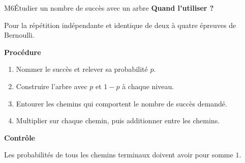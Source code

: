 \begin{fichemethode}{M6}{Étudier un nombre de succès avec un arbre}
  \textbf{Quand l'utiliser ?}

  Pour la répétition indépendante et identique de deux à quatre épreuves de
  Bernoulli.

  \textbf{Procédure}
  \begin{enumerate}
    \item Nommer le succès et relever sa probabilité $p$.
    \item Construire l'arbre avec $p$ et $1-p$ à chaque niveau.
    \item Entourer les chemins qui comportent le nombre de succès demandé.
    \item Multiplier sur chaque chemin, puis additionner entre les chemins.
  \end{enumerate}

  \textbf{Contrôle}

  Les probabilités de tous les chemins terminaux doivent avoir pour somme $1$.
\end{fichemethode}
